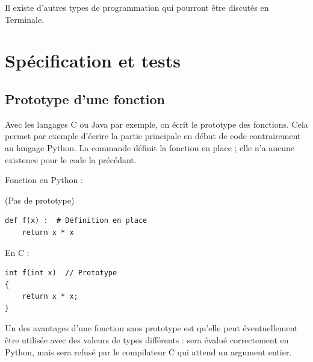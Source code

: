 \medskip

Il existe d'autres types de programmation qui pourront être discutés en Terminale.


\chapter{Spécification et tests}

\section{Prototype d'une fonction}


Avec les langages C ou Java par exemple, on écrit le prototype des fonctions. Cela permet par exemple d'écrire la partie principale en début de code contrairement au langage Python. La commande  définit la fonction en place ; elle n'a aucune existence pour le code la précédant.

\begin{multicols}{2}  
  Fonction en Python :
  
  (Pas de prototype)
  
  \vspace{-2ex}
\begin{verbatim}
def f(x) :  # Définition en place
    return x * x 
\end{verbatim} 
  
   En C :
  
  \vspace{-2ex}
\begin{verbatim}
int f(int x)  // Prototype
{
    return x * x;
}
\end{verbatim}
\end{multicols}

Un des avantages d'une fonction sans prototype est qu'elle peut éventuellement être utilisée avec des valeurs de types différents :  sera évalué correctement en Python, mais sera refusé par le compilateur C qui attend un argument entier.

